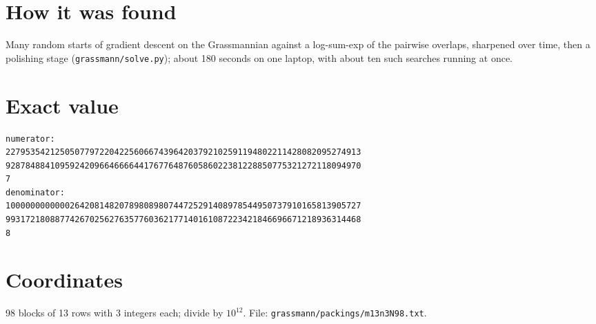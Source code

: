\documentclass[11pt,a4paper]{article}
\begin{document}
\section{How it was found}
Many random starts of gradient descent on the Grassmannian against a log-sum-exp of the pairwise overlaps, sharpened over time, then a polishing stage (\texttt{grassmann/solve.py}); about 180 seconds on one laptop, with about ten such searches running at once.


\appendix
\section{Exact value}
{\small
\begin{verbatim}
numerator:
227953542125050779722042256066743964203792102591194802211428082095274913
928784884109592420966466664417677648760586022381228850775321272118094970
7
denominator:
100000000000026420814820789808980744725291408978544950737910165813905727
993172180887742670256276357760362177140161087223421846696671218936314468
8
\end{verbatim}}

\section{Coordinates}
98 blocks of 13 rows with 3 integers each; divide by $10^{12}$. File: \texttt{grassmann/packings/m13n3N98.txt}.
{\tiny
\begin{multicols}{3}
\end{multicols}}
\end{document}

